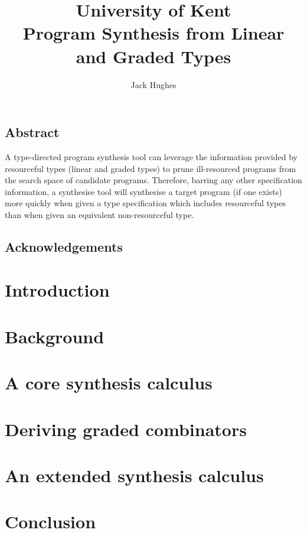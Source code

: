\documentclass[11pt]{UoKthesis}
\theoremstyle{plain}%
\theoremstyle{definition}
\begin{document}
\normalsize
\title{University of Kent\\Program Synthesis from Linear and Graded Types}
\author{Jack Hughes}
\subject{computer science}

\begin{preface}
\section{Abstract}
A type-directed program synthesis tool can leverage the information provided by
resourceful types (linear and graded types) to prune ill-resourced programs from
the search space of candidate programs. Therefore, barring any other
specification information, a synthesise tool will synthesise a target program
(if one exists) more quickly when given a type specification which includes
resourceful types than when given an equivalent non-resourceful type.


\section{Acknowledgements}
\end{preface}


\chapter{Introduction}
\label{chapter:intro}


\chapter{Background}
\label{chapter:background}


\chapter{A core synthesis calculus}
\label{chapter:core}


\chapter{Deriving graded combinators}
\label{chapter:deriving}


\chapter{An extended synthesis calculus}
\label{chapter:extended}


\chapter{Conclusion}
\label{chapter:conclusion}


{}

\newpage
\appendix

\end{document}
